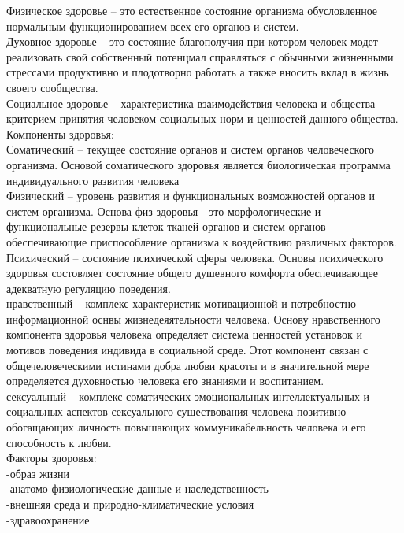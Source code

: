 \documentclass[a4paper, 12pt]{article}
\begin{document}
Физическое здоровье -- это естественное состояние организма обусловленное нормальным функционированием всех его органов и систем.\\

Духовное здоровье -- это состояние благополучия при котором человек модет реализовать свой собственный потенцмал справляться с обычными жизненными стрессами продуктивно и плодотворно работать а также вносить вклад в жизнь своего сообщества.\\

Социальное здоровье -- характеристика взаимодействия человека и общества критерием принятия  человеком социальных норм и ценностей данного общества.\\

Компоненты здоровья:\\
Соматический -- текущее состояние органов и систем органов человеческого организма. Основой соматического здоровья является биологическая программа индивидуального развития человека\\
Физический -- уровень развития и функциональных возможностей органов и систем организма. Основа физ здоровья - это морфологические и функциональные резервы клеток тканей органов и систем органов обеспечивающие приспособление организма к воздействию различных факторов.\\
Психический -- состояние психической сферы человека. Основы психического здоровья состовляет состояние общего душевного комфорта обеспечивающее адекватную регуляцию поведения.\\
нравственный -- комплекс характеристик мотивационной и потребностно информационной оснвы жизнедеяятельности человека. Основу нравственного компонента здоровья человека определяет система ценностей установок и мотивов поведения индивида в социальной среде.
Этот компонент связан с общечеловеческими истинами добра любви красоты и в значительной мере определяется духовностью человека его знаниями и воспитанием.\\
сексуальный -- комплекс соматических эмоциональных интеллектуальных и социальных аспектов сексуального существования человека позитивно обогащающих личность повышающих коммуникабельность человека и его способность к любви.\\

Факторы здоровья:\\
-образ жизни\\
-анатомо-физиологические данные и наследственность\\
-внешняя среда и природно-климатические условия\\
-здравоохранение\\
\end{document}
